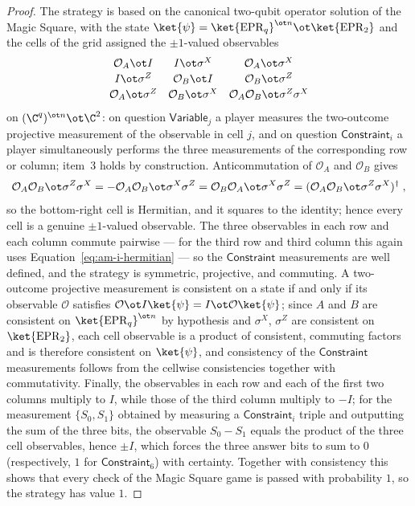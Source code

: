 \begin{proof}
	\leanok
	The strategy is based on the canonical two-qubit operator solution of the Magic Square, with the state $\ket{\psi} = \ket{\mathrm{EPR}_q}^{\ot n} \ot \ket{\mathrm{EPR}_2}$ and the cells of the grid assigned the $\pm 1$-valued observables
	\[
		\begin{array}{ccc}
			\mathcal O_A \ot I & I \ot \sigma^X & \mathcal O_A \ot \sigma^X \\[2pt]
			I \ot \sigma^Z & \mathcal O_B \ot I & \mathcal O_B \ot \sigma^Z \\[2pt]
			\mathcal O_A \ot \sigma^Z & \mathcal O_B \ot \sigma^X & \mathcal O_A \mathcal O_B \ot \sigma^Z \sigma^X
		\end{array}
	\]
	on $(\C^q)^{\ot n} \ot \C^2$: on question $\mathsf{Variable}_j$ a player measures the two-outcome projective measurement of the observable in cell $j$, and on question $\mathsf{Constraint}_i$ a player simultaneously performs the three measurements of the corresponding row or column; item~3 holds by construction. Anticommutation of $\mathcal O_A$ and $\mathcal O_B$ gives
	\begin{equation}\label{eq:am-i-hermitian}
		\mathcal O_A \mathcal O_B \ot \sigma^Z \sigma^X
		= - \mathcal O_A \mathcal O_B \ot \sigma^X \sigma^Z
		= \mathcal O_B \mathcal O_A \ot \sigma^X \sigma^Z
		= (\mathcal O_A \mathcal O_B \ot \sigma^Z \sigma^X)^\dagger\;,
	\end{equation}
	so the bottom-right cell is Hermitian, and it squares to the identity; hence every cell is a genuine $\pm 1$-valued observable. The three observables in each row and each column commute pairwise --- for the third row and third column this again uses Equation~\eqref{eq:am-i-hermitian} --- so the $\mathsf{Constraint}$ measurements are well defined, and the strategy is symmetric, projective, and commuting. A two-outcome projective measurement is consistent on a state if and only if its observable $\mathcal O$ satisfies $\mathcal O \ot I \ket{\psi} = I \ot \mathcal O \ket{\psi}$; since $A$ and $B$ are consistent on $\ket{\mathrm{EPR}_q}^{\ot n}$ by hypothesis and $\sigma^X$, $\sigma^Z$ are consistent on $\ket{\mathrm{EPR}_2}$, each cell observable is a product of consistent, commuting factors and is therefore consistent on $\ket{\psi}$, and consistency of the $\mathsf{Constraint}$ measurements follows from the cellwise consistencies together with commutativity. Finally, the observables in each row and each of the first two columns multiply to $I$, while those of the third column multiply to $-I$; for the measurement $\{S_0, S_1\}$ obtained by measuring a $\mathsf{Constraint}_i$ triple and outputting the sum of the three bits, the observable $S_0 - S_1$ equals the product of the three cell observables, hence $\pm I$, which forces the three answer bits to sum to $0$ (respectively, $1$ for $\mathsf{Constraint}_6$) with certainty. Together with consistency this shows that every check of the Magic Square game is passed with probability $1$, so the strategy has value $1$.
\end{proof}

